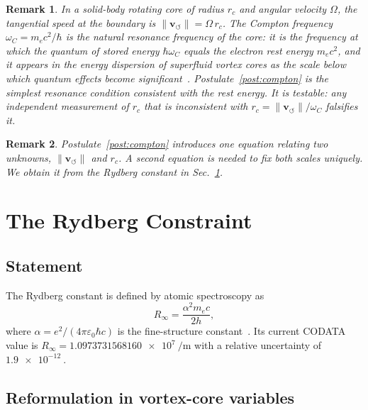 \documentclass[aps,pra,preprint,longbibliography,nofootinbib]{revtex4-2}
\newtheorem{remark}{Remark}
\newcommand{\vnorm}{\lVert\mathbf{v}_{\!\boldsymbol{\circlearrowleft}}\rVert} %
\newcommand{\rc}{r_c}                            %
\newcommand{\omC}{\omega_C}                      %
\newcommand{\Rinf}{R_\infty}                     %
\begin{document}
\begin{remark}
\label{rem:motivation}
In a solid-body rotating core of radius $\rc$ and angular velocity
$\Omega$, the tangential speed at the boundary is $\vnorm = \Omega\,\rc$.
The Compton frequency $\omC = m_e c^2/\hbar$ is the natural resonance
frequency of the core: it is the frequency at which the quantum of
stored energy $\hbar\omC$ equals the electron rest energy $m_e c^2$,
and it appears in the energy dispersion of superfluid vortex cores as
the scale below which quantum effects become
significant~\cite{Donnelly1991,Pethick2008}.
Postulate~\ref{post:compton} is the simplest resonance condition
consistent with the rest energy.
It is testable: any independent measurement of $\rc$ that is
inconsistent with $\rc = \vnorm/\omC$ falsifies it.
\end{remark}

\begin{remark}
Postulate~\ref{post:compton} introduces one equation relating two
unknowns, $\vnorm$ and $\rc$.
A second equation is needed to fix both scales uniquely.
We obtain it from the Rydberg constant in Sec.~\ref{sec:rydberg}.
\end{remark}

\section{The Rydberg Constraint}
\label{sec:rydberg}

\subsection{Statement}

The Rydberg constant is defined by atomic spectroscopy as
\begin{equation}
  \Rinf = \frac{\alpha^2 m_e c}{2h},
  \label{eq:Rydberg_standard}
\end{equation}
where $\alpha = e^2/(4\pi\varepsilon_0\hbar c)$ is the fine-structure
constant~\cite{MohrTaylor2018}.
Its current CODATA value is
$\Rinf = \SI{1.0973731568160e7}{\per\meter}$
with a relative uncertainty of $\SI{1.9e-12}{}$.

\subsection{Reformulation in vortex-core variables}
\end{document}
